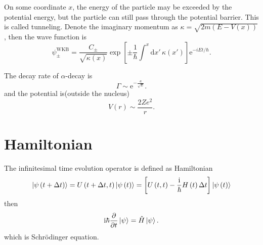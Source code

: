 
On some coordinate $x$, the energy of the particle may be exceeded by the potential energy, but the particle can still pass through the potential barrier. This is called tunneling. Denote the imaginary momentum as $\kappa = \sqrt{2m \left( E - V\left( x \right)  \right) }$, then the wave function is
\begin{equation}
  \psi_{\pm }^{\text{WKB}} = \frac{C_{\pm }}{\sqrt{\kappa\left( x \right) }} \exp \left[ \pm \frac{1}{\hbar} \int_{}^{x} \mathrm{d}x' \, \kappa \left( x' \right)   \right] \mathrm{e}^{- i Et / \hbar}.
\end{equation}

The decay rate of $\alpha$-decay is 
\begin{equation}
  \Gamma \sim \mathrm{e}^{-\frac{a}{\sqrt{E}}}.
\end{equation}
and the potential is(outside the nucleus)
\begin{equation}
  V \left( r \right) \sim \frac{2 Z e^{2}}{r}.
\end{equation}

\chapter[哈密顿量矩阵]{Hamiltonian}

The infinitesimal time evolution operator is defined as Hamiltonian
\begin{equation}
  \ket{\psi\left( t + \Delta t\right) } = U\left( t + \Delta t, t \right) \ket{\psi\left( t \right) } = \left[ U \left( t,t \right) - \frac{\mathrm{i} }{\hbar} H \left( t \right)  \Delta t \right] \ket{\psi\left( t \right) }
\end{equation}
then
\begin{equation}
    \mathrm{i} \hbar \frac{\partial }{\partial t} \ket{\psi} = \hat{H} \ket{\psi}.
\end{equation}
which is Schr\"{o}dinger equation.